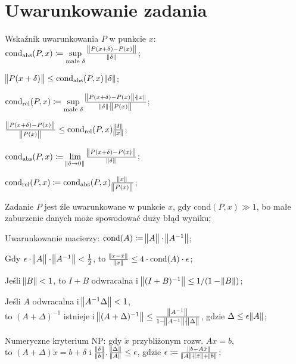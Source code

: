 \section{Uwarunkowanie zadania}

\entry
Wskaźnik uwarunkowania $P$ w punkcie $x$:\\ $\mathrm{cond}_{\mathrm{abs}}(P,x) \coloneqq \sup\limits_{\text{małe }\delta} \frac{\norm{P(x+\delta) - P(x)}}{\norm{\delta}}$;

\entry
$\norm{P(x+\delta)} \leq \mathrm{cond}_{\mathrm{abs}}(P,x)\norm{\delta}$;

\entry
$\mathrm{cond}_{\mathrm{rel}}(P,x) \coloneqq \sup\limits_{\text{małe }\delta} \frac{\norm{P(x+\delta) - P(x)} \cdot \norm{x}}{\norm{\delta} \cdot \norm{P(x)}}$;

\entry
$\frac{\norm{P(x+\delta) - P(x)}}{\norm{P(x)}} \leq \mathrm{cond}_{\mathrm{rel}}(P,x)\frac{\norm{\delta}}{\norm{x}}$;


\entry
$\mathrm{cond}_{\mathrm{abs}}(P,x) \coloneqq \lim\limits_{\norm{\delta \to 0}} \frac{\norm{P(x+\delta) - P(x)}}{\norm{\delta}}$;

\entry
$\mathrm{cond}_{\mathrm{rel}}(P,x) \coloneqq \mathrm{cond}_{\mathrm{abs}}(P,x)\frac{\norm{x}}{\norm{P(x)}} $;

\entry
Zadanie $P$ jest źle uwarunkowane w punkcie $x$, gdy $\mathrm{cond}(P,x) \gg 1$, bo małe zaburzenie danych może spowodować duży błąd wyniku;

\entry
Uwarunkowanie macierzy: $\mathrm{cond}(A) \coloneqq \norm{\vphantom{A^{-1}}A}\cdot\norm{A^{-1}}$;

\entry
Gdy $\epsilon\cdot\norm{\vphantom{A^1}A}\cdot\norm{A^{-1}} < \frac{1}{2}$, to $\frac{\norm{x - \tilde{x}}}{\norm{x}} \leq 4 \cdot \mathrm{cond}(A) \cdot \epsilon$;

\entry
Jeśli $\norm{B} < 1$, to $I+B$ odwracalna i $\norm{(I+B)^{-1}} \leq 1 / (1 - \norm{B})$;

\entry
Jeśli $A$ odwracalna i $\norm{A^{-1}\Delta} < 1$,\\ to $(A+\Delta)^{-1}$ istnieje i $\norm{(A+\Delta)^{-1}} \leq \frac{\norm{A^{-1}}}{1 - \norm{A^{-1}} \cdot \norm{\vphantom{A^1}\Delta}}$, gdzie $\Delta \leq \epsilon\norm{A}$;


\entry
Numeryczne kryterium NP: gdy $\tilde{x}$ przybliżonym rozw. $Ax=b$,\\ to $(A+\Delta)\tilde{x}=b+\delta$ i $\frac{\norm{\delta}}{\norm{b}}, \frac{\norm{\Delta}}{\norm{A}} \leq \epsilon$, gdzie $\epsilon \coloneqq \frac{\norm{b-A\tilde{x}}}{\norm{A} \cdot \norm{\tilde{x}} + \norm{b} }$;


